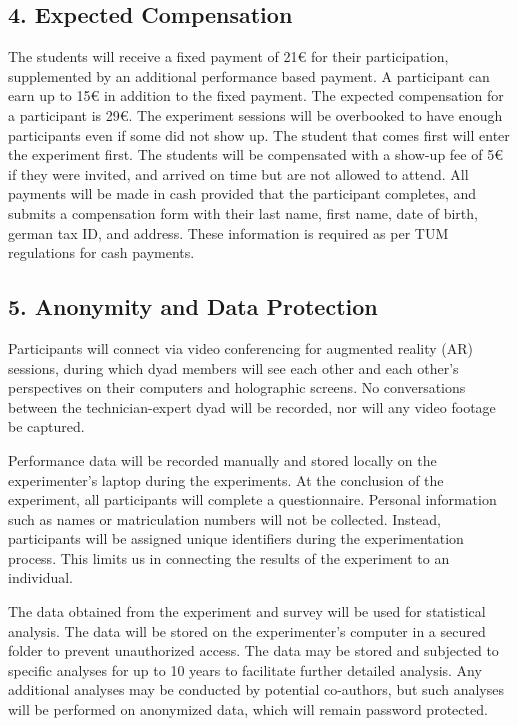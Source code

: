 \documentclass[A4,11pt]{article}
\begin{document}
\subsection*{4. Expected Compensation}
The students will receive a fixed payment of 21€ for their participation, supplemented by an additional performance based payment. A participant can earn up to 15€ in addition to the fixed payment. The expected compensation for a participant is 29€. The experiment sessions will be overbooked to have enough participants even if some did not show up. The student that comes first will enter the experiment first. The students will be compensated with a show-up fee of 5€ if they were invited, and arrived on time but are not allowed to attend. All payments will be made in cash provided that the participant completes, and submits a compensation form with their last name, first name, date of birth, german tax ID, and address. These information is required as per TUM regulations for cash payments.

\subsection*{5. Anonymity and Data Protection}
Participants will connect via video conferencing for augmented reality (AR) sessions, during which dyad members will see each other and each other's perspectives on their computers and holographic screens. No conversations between the technician-expert dyad will be recorded, nor will any video footage be captured.

Performance data will be recorded manually and stored locally on the experimenter's laptop during the experiments. At the conclusion of the experiment, all participants will complete a questionnaire. Personal information such as names or matriculation numbers will not be collected. Instead, participants will be assigned unique identifiers during the experimentation process. This limits us in connecting the results of the experiment to an individual. 

The data obtained from the experiment and survey will be used for statistical analysis. The data will be stored on the experimenter's computer in a secured folder to prevent unauthorized access. The data may be stored and subjected to specific analyses for up to 10 years to facilitate further detailed analysis. Any additional analyses may be conducted by potential co-authors, but such analyses will be performed on anonymized data, which will remain password protected.
\end{document}
